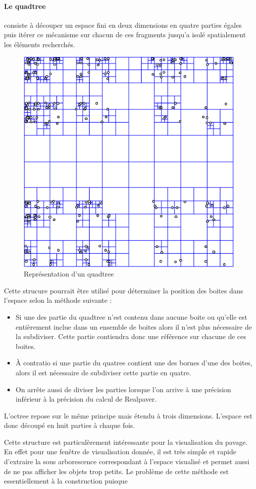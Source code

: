 \documentclass[11pt,a4paper,utf8x]{report}
\begin{document}
\paragraph{Le quadtree}consiste à découper un espace fini en deux dimensions en quatre parties égales puis itérer ce mécanisme sur chacun de ces fragments jusqu'a isolé spatialement les éléments recherchés.
\begin{figure}[htbp]
\centering
\includegraphics[scale=0.30]{quadtree}
\caption{Représentation d'un quadtree}
\end{figure}
Cette strucure pourrait être utilisé pour déterminer la position des boites dans l'espace selon la méthode suivante :
\begin{itemize}
\item Si une des partie du quadtree n'est contenu dans aucune boite ou qu'elle est entièrement inclue dans un ensemble de boites alors il n'est plus nécessaire de la subdiviser. Cette partie contiendra donc une référence sur chacune de ces boites.
\item \`A contratio si une partie du quatree contient une des bornes d'une des boites, alors il est nécessaire de subdiviser cette partie en quatre.
\item On arrête aussi de diviser les parties lorsque l'on arrive à une précision inférieur à la précision du calcul de Realpaver.
\end{itemize}
L'octree repose sur le même principe mais étendu à trois dimensions. L'espace est donc découpé en huit parties à chaque fois.

Cette structure est particulèrement intéressante pour la visualisation du pavage. En effet pour une fenêtre de visualisation donnée, il est très simple et rapide d'extraire la sous arborescence correspondant à l'espace visualisé et permet aussi de ne pas afficher les objets trop petits. Le problème de cette méthode est essentiellement à la construction puisque
\end{document}
